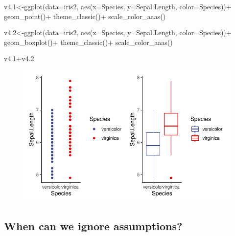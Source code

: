 \documentclass[
  letterpaper,
  DIV=11,
  numbers=noendperiod]{scrartcl}
\newenvironment{Shaded}{\begin{snugshade}}{\end{snugshade}}
\newcommand{\AttributeTok}[1]{\textcolor[rgb]{0.40,0.45,0.13}{#1}}
\newcommand{\FloatTok}[1]{\textcolor[rgb]{0.68,0.00,0.00}{#1}}
\newcommand{\FunctionTok}[1]{\textcolor[rgb]{0.28,0.35,0.67}{#1}}
\newcommand{\NormalTok}[1]{\textcolor[rgb]{0.00,0.23,0.31}{#1}}
\newcommand{\OtherTok}[1]{\textcolor[rgb]{0.00,0.23,0.31}{#1}}
\newcommand{\SpecialCharTok}[1]{\textcolor[rgb]{0.37,0.37,0.37}{#1}}
\begin{document}
\begin{Shaded}
\begin{Highlighting}[]
\NormalTok{v4}\FloatTok{.1}\OtherTok{\textless{}{-}}\FunctionTok{ggplot}\NormalTok{(}\AttributeTok{data=}\NormalTok{iris2, }\FunctionTok{aes}\NormalTok{(}\AttributeTok{x=}\NormalTok{Species, }\AttributeTok{y=}\NormalTok{Sepal.Length, }\AttributeTok{color=}\NormalTok{Species))}\SpecialCharTok{+}
  \FunctionTok{geom\_point}\NormalTok{()}\SpecialCharTok{+}
  \FunctionTok{theme\_classic}\NormalTok{()}\SpecialCharTok{+}
  \FunctionTok{scale\_color\_aaas}\NormalTok{()}

\NormalTok{v4}\FloatTok{.2}\OtherTok{\textless{}{-}}\FunctionTok{ggplot}\NormalTok{(}\AttributeTok{data=}\NormalTok{iris2, }\FunctionTok{aes}\NormalTok{(}\AttributeTok{x=}\NormalTok{Species, }\AttributeTok{y=}\NormalTok{Sepal.Length, }\AttributeTok{color=}\NormalTok{Species))}\SpecialCharTok{+}
  \FunctionTok{geom\_boxplot}\NormalTok{()}\SpecialCharTok{+}
  \FunctionTok{theme\_classic}\NormalTok{()}\SpecialCharTok{+}
  \FunctionTok{scale\_color\_aaas}\NormalTok{()}

\NormalTok{v4}\FloatTok{.1}\SpecialCharTok{+}\NormalTok{v4}\FloatTok{.2}
\end{Highlighting}
\end{Shaded}

\begin{figure}[H]

{\centering \includegraphics{t_test_files/figure-pdf/unnamed-chunk-14-1.pdf}

}

\end{figure}

\hypertarget{when-can-we-ignore-assumptions}{%
\subsection{\texorpdfstring{\textbf{When can we ignore
assumptions?}}{When can we ignore assumptions?}}\label{when-can-we-ignore-assumptions}}
\end{document}
